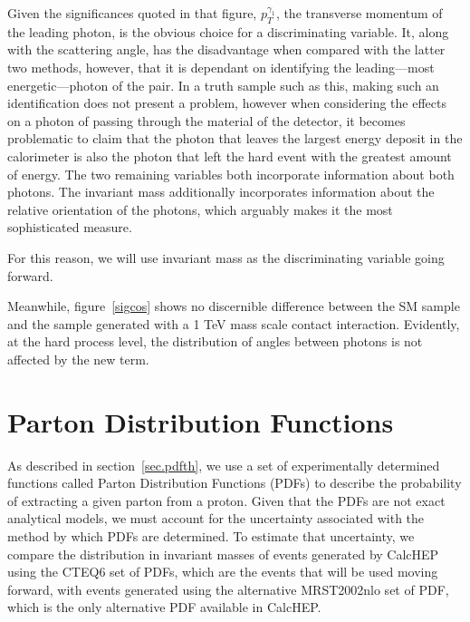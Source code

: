 Given the significances quoted in that figure, $p^{\gamma_1}_T$, the transverse momentum of the leading photon, is the obvious choice for a discriminating variable. It, along with the scattering angle, has the disadvantage when compared with the latter two methods, however, that it is dependant on identifying the leading---most energetic---photon of the pair. In a truth sample such as this, making such an identification does not present a problem, however when considering the effects on a photon of passing through the material of the detector, it becomes problematic to claim that the photon that leaves the largest energy deposit in the calorimeter is also the photon that left the hard event with the greatest amount of energy. The two remaining variables both incorporate information about both photons. The invariant mass additionally incorporates information about the relative orientation of the photons, which arguably makes it the most sophisticated measure. 


For this reason, we will use invariant mass as the discriminating variable going forward.

Meanwhile, figure~\ref{sigcos} shows no discernible difference between the SM sample and the sample generated with a 1 TeV mass scale contact interaction. Evidently, at the hard process level, the distribution of angles between photons is not affected by the new term.

\section{Parton Distribution Functions}
As described in section~\ref{sec.pdfth}, we use a set of experimentally determined functions called Parton Distribution Functions (PDFs) to describe the probability of extracting a given parton from a proton. Given that the PDFs are not exact analytical models, we must account for the uncertainty associated with the method by which  PDFs are determined. To estimate that uncertainty, we compare the distribution in invariant masses of events generated by CalcHEP using the CTEQ6 set of PDFs, which are the events that will be used moving forward, with events generated using the alternative MRST2002nlo set of PDF, which is the only alternative PDF available in CalcHEP.

